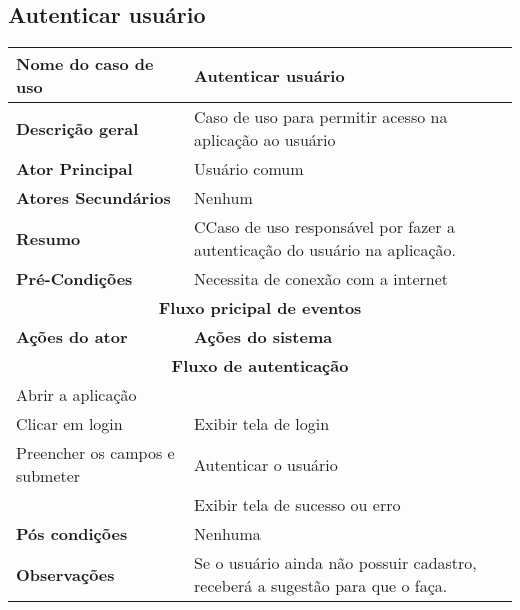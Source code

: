 \subsection{Autenticar usuário}
\begin{center}
\begin{tabular}{ |p{7cm}|p{7cm}| } 
 \hline
 \textbf {Nome do caso de uso} & Autenticar usuário\\
 \hline
 \textbf{Descrição geral} & Caso de uso para permitir acesso na aplicação ao usuário \\
 \hline
 \textbf{Ator Principal} & Usuário comum \\ 
 \hline
 \textbf{Atores Secundários} & Nenhum \\
 \hline
 \textbf{Resumo} & CCaso de uso responsável por fazer a autenticação do usuário na aplicação. \\
 \hline
 \textbf{Pré-Condições} & Necessita de conexão com a internet\\
 \hline 
 \multicolumn{2}{|c|}{\textbf{Fluxo pricipal de eventos} } \\
 \hline
 \textbf{Ações do ator} & \textbf{Ações do sistema} \\
 \hline
 \multicolumn{2}{|c|}{\textbf{Fluxo de autenticação} } \\
 \hline 
 Abrir a aplicação & \\
 \hline
 Clicar em login & Exibir tela de login \\
 \hline
 Preencher os campos e submeter & Autenticar o usuário \\
 \hline
 & Exibir tela de sucesso ou erro\\
 \hline
 \textbf{Pós condições} & Nenhuma \\
 \hline
 \textbf{Observações} & Se o usuário ainda não possuir cadastro, receberá a sugestão para que o faça.\\
 \hline
\end{tabular}
\end{center}